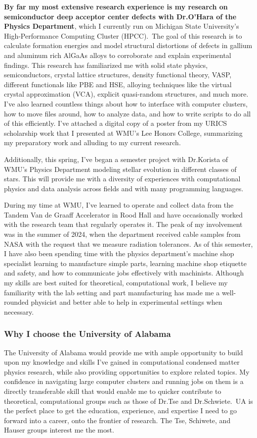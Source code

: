 \documentclass[11pt]{article}
\newcommand{\school}{University of Alabama}
\newcommand{\schoolabbr}{UA}
\begin{document}
\textbf{By far my most extensive research experience is my research on semiconductor deep acceptor center defects with Dr.\@ O'Hara of the Physics Department}, which I currently run on Michigan State University's High-Performance Computing Cluster (HPCC).\ The goal of this research is to calculate formation energies and model structural distortions of defects in gallium and aluminum rich AlGaAs alloys to corroborate and explain experimental findings. This research has familiarized me with solid state physics, semiconductors, crystal lattice structures, density functional theory, VASP, different functionals like PBE and HSE, alloying techniques like the virtual crystal approximation (VCA), explicit quasi-random structures, and much more. I've also learned countless things about how to interface with computer clusters, how to move files around, how to analyze data, and how to write scripts to do all of this efficiently. I've attached a digital copy of a poster from my URICS scholarship work that I presented at WMU's Lee Honors College, summarizing my preparatory work and alluding to my current research.
\pagebreak

Additionally, this spring, I've began a semester project with Dr.\@ Korista of WMU's Physics Department modeling stellar evolution in different classes of stars. This will provide me with a diversity of experiences with computational physics and data analysis across fields and with many programming languages.

During my time at WMU, I've learned to operate and collect data from the Tandem Van de Graaff Accelerator in Rood Hall and have occasionally worked with the research team that regularly operates it. The peak of my involvement was in the summer of 2024, when the department received cable samples from NASA with the request that we measure radiation tolerances. As of this semester, I have also been spending time with the physics department's machine shop specialist learning to manufacture simple parts, learning machine shop etiquette and safety, and how to communicate jobs effectively with machinists. Although my skills are best suited for theoretical, computational work, I believe my familiarity with the lab setting and part manufacturing has made me a well-rounded physicist and better able to help in experimental settings when necessary.

\subsubsection*{Why I choose the \school{}}
The \school{} would provide me with ample opportunity to build upon my knowledge and skills I've gained in computational condensed matter physics research, while also providing opportunities to explore related topics. My confidence in navigating large computer clusters and running jobs on them is a directly transferable skill that would enable me to quicker contribute to theoretical, computational groups such as those of Dr.\@ Tse and Dr.\@ Schwiete.\ \schoolabbr{} is the perfect place to get the education, experience, and expertise I need to go forward into a career, onto the frontier of research. The Tse, Schiwete, and Hauser groups interest me the most.
\end{document}

